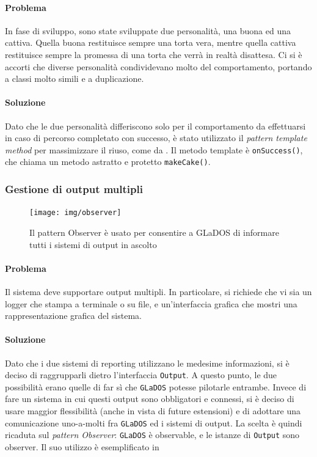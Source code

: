 \documentclass[a4paper,12pt]{report}
\begin{document}
\paragraph{Problema} In fase di sviluppo, sono state sviluppate due personalità, una buona ed una cattiva.
Quella buona restituisce sempre una torta vera, mentre quella cattiva restituisce sempre la
promessa di una torta che verrà in realtà disattesa.
Ci si è accorti che diverse personalità condividevano molto del comportamento,
portando a classi molto simili e a duplicazione.

\paragraph{Soluzione} Dato che le due personalità differiscono solo per il comportamento da effettuarsi in caso di percorso completato con successo,
è stato utilizzato il \textit{pattern template method} per massimizzare il riuso, come da .
Il metodo template è \texttt{onSuccess()}, che chiama un metodo astratto e protetto
\texttt{makeCake()}.

\subsubsection{Gestione di output multipli}

\begin{figure}[H]
\centering{}
\texttt{[image: img/observer]}
\caption{Il pattern Observer è usato per consentire a GLaDOS di informare tutti i sistemi di output in ascolto}
\label{img:observer}
\end{figure}

\paragraph{Problema} Il sistema deve supportare output multipli. In particolare, si richiede che vi sia un logger che stampa a terminale o su file,
e un'interfaccia grafica che mostri una rappresentazione grafica del sistema.

\paragraph{Soluzione} Dato che i due sistemi di reporting utilizzano le medesime informazioni, si è deciso di raggrupparli dietro l'interfaccia \texttt{Output}.
A questo punto, le due possibilità erano quelle di far sì che \texttt{GLaDOS} potesse pilotarle entrambe.
Invece di fare un sistema in cui questi output sono obbligatori e connessi, si è deciso di usare maggior flessibilità (anche in vista di future estensioni)
e di adottare una comunicazione uno-a-molti fra \texttt{GLaDOS} ed i sistemi di output.
La scelta è quindi ricaduta sul \textit{pattern Observer}: \texttt{GLaDOS} è observable, e le istanze di \texttt{Output} sono observer.
%
Il suo utilizzo è esemplificato in 
\end{document}
